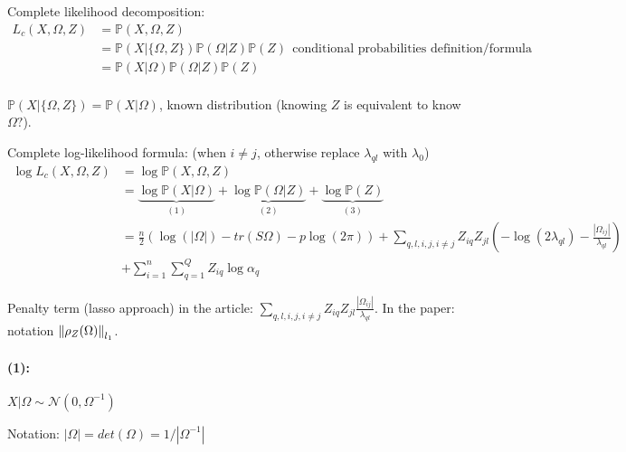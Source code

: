 \documentclass[10pt]{article}
\begin{document}
Complete likelihood decomposition:
\begin{align*}
L_c(X, \Omega, Z) &= \mathbb{P}(X,\Omega, Z) \\
           & =  \mathbb{P}(X|\{\Omega, Z\})\mathbb{P}(\Omega|Z)\mathbb{P}(Z) ~~ \text{conditional probabilities definition/formula} \\
           & =  \mathbb{P}(X|\Omega)\mathbb{P}(\Omega|Z)\mathbb{P}(Z) \\
\end{align*}

$\mathbb{P}(X| \{ \Omega, Z \}) =  \mathbb{P}(X|\Omega)$, known distribution (knowing $Z$ is equivalent to know $\Omega ?$). 

Complete log-likelihood formula: (when $i \neq j$, otherwise replace $\lambda_{ql}$ with $\lambda_0$)
\begin{align*}
\log L_c(X, \Omega, Z) &= \log \mathbb{P}(X,\Omega, Z) \\
           & =  \underbrace{\log \mathbb{P}(X|\Omega)}_{(1)}+ \underbrace{\log \mathbb{P}(\Omega|Z)}_{(2)} + \underbrace{\log \mathbb{P}(Z)}_{(3)} \\
           & = \frac{n}{2} \left( \log(|\Omega|) - tr(S\Omega)  - p\log(2\pi) \right) +  \sum_{q,l,i,j , i \neq j} Z_{iq}Z_{jl}\left( -\log (2\lambda_{ql}) - \frac{|\Omega_{ij}|}{\lambda_{ql}} \right) \\
           & + \sum_{i = 1}^n \sum_{q = 1}^Q Z_{iq} \log \alpha_q
\end{align*}

Penalty term (lasso approach) in the article: $\sum_{q,l,i,j , i \neq j} Z_{iq}Z_{jl}\frac{|\Omega_{ij}|}{\lambda_{ql}}$. In the paper: notation $\left\lVert{\rho_Z(\Omega)}\right\rVert_{l_1}$.

\paragraph{(1):}  $X|\Omega \sim \mathcal{N}(0, \Omega^{-1})$

Notation: $|\Omega| = det(\Omega) = 1/|\Omega^{-1}|$
\end{document}
